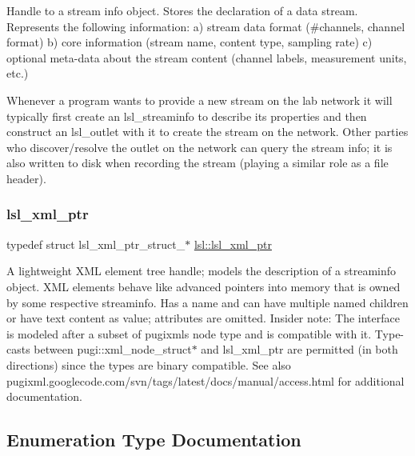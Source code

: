 Handle to a stream info object. Stores the declaration of a data stream. Represents the following information\+: a) stream data format (\#channels, channel format) b) core information (stream name, content type, sampling rate) c) optional meta-\/data about the stream content (channel labels, measurement units, etc.)

Whenever a program wants to provide a new stream on the lab network it will typically first create an lsl\+\_\+streaminfo to describe its properties and then construct an lsl\+\_\+outlet with it to create the stream on the network. Other parties who discover/resolve the outlet on the network can query the stream info; it is also written to disk when recording the stream (playing a similar role as a file header). \mbox{\label{namespacelsl_a5edc7a49a1a1be1634fe6dce3d59c59b}} 
\subsubsection{\texorpdfstring{lsl\+\_\+xml\+\_\+ptr}{lsl\_xml\_ptr}}
{\footnotesize\ttfamily typedef struct lsl\+\_\+xml\+\_\+ptr\+\_\+struct\+\_\+$\ast$ \hyperlink{namespacelsl_a5edc7a49a1a1be1634fe6dce3d59c59b}{lsl\+::lsl\+\_\+xml\+\_\+ptr}}

A lightweight X\+ML element tree handle; models the description of a streaminfo object. X\+ML elements behave like advanced pointers into memory that is owned by some respective streaminfo. Has a name and can have multiple named children or have text content as value; attributes are omitted. Insider note\+: The interface is modeled after a subset of pugixml\textquotesingle{}s node type and is compatible with it. Type-\/casts between pugi\+::xml\+\_\+node\+\_\+struct$\ast$ and lsl\+\_\+xml\+\_\+ptr are permitted (in both directions) since the types are binary compatible. See also pugixml.\+googlecode.\+com/svn/tags/latest/docs/manual/access.html for additional documentation. 

\subsection{Enumeration Type Documentation}
\mbox{\label{namespacelsl_a28d50dae6fd82eea8893ce3d63ccd46c}} 
